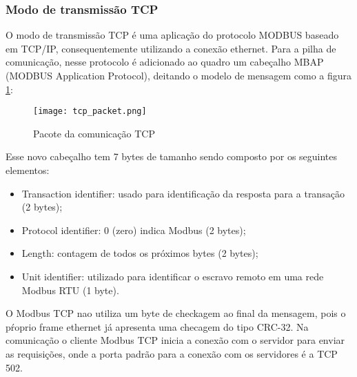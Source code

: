 \subsubsection{Modo de transmissão TCP}
O modo de transmissão TCP é uma aplicação do protocolo MODBUS baseado em TCP/IP, consequentemente utilizando a conexão ethernet. Para a pilha de comunicação, nesse protocolo é adicionado ao quadro um cabeçalho MBAP (MODBUS Application Protocol), deitando o modelo de mensagem como a figura \ref{fig:tcp_packet}:

\begin{figure}[h]
	\centering
	\texttt{[image: tcp\_packet.png]}
	\caption{Pacote da comunicação TCP}
	\label{fig:tcp_packet}
\end{figure}
Esse novo cabeçalho tem 7 bytes de tamanho sendo composto por os seguintes elementos:
\begin{itemize}
	\item Transaction identifier: usado para identificação da resposta para a transação (2 bytes);
	\item Protocol identifier: 0 (zero) indica Modbus (2 bytes);
	\item Length: contagem de todos os próximos bytes (2 bytes);
	\item Unit identifier: utilizado para identificar o escravo remoto em uma rede Modbus RTU (1 byte).
	
\end{itemize}

O Modbus  TCP nao utiliza um byte de checkagem ao final da mensagem, pois o pŕoprio frame ethernet já apresenta uma checagem do tipo CRC-32. Na comunicação o cliente Modbus TCP inicia a conexão com o servidor para enviar as requisições, onde a porta padrão para a conexão com os servidores é a TCP 502.
